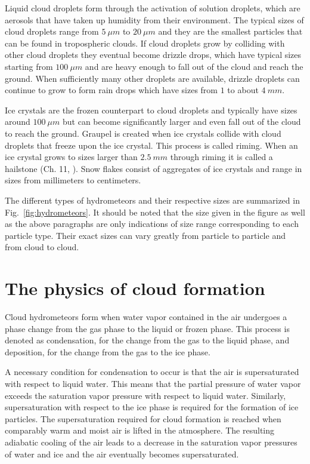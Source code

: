 Liquid cloud droplets form through the activation of  solution
droplets, which are aerosols that have taken up humidity from their environment.
The typical sizes of cloud droplets range from $5\ \unit{\mu m}$ to
$20\ \unit{\mu m}$ and they are the smallest particles that can be found in
tropospheric clouds. If cloud droplets grow by colliding with other cloud
droplets they eventual become drizzle drops, which have typical sizes
starting from $100\ \unit{\mu m}$ and are heavy enough to fall out of the cloud
and reach the ground. When sufficiently many other droplets are available,
drizzle droplets can continue to grow to form rain drops which have sizes from
$1$ to about $4\ \unit{mm}$.

Ice crystals are the frozen counterpart to cloud droplets and typically have
sizes around $100\ \unit{\mu m}$ but can become significantly larger and even
fall out of the cloud to reach the ground. Graupel is created when ice crystals
collide with cloud droplets that freeze upon the ice crystal. This process is
called riming. When an ice crystal grows to sizes larger than $2.5\ \unit{mm}$
through riming it is called a hailstone (Ch. 11, \textcite{lohmann16}). Snow flakes
consist of aggregates of ice crystals and range in sizes from millimeters to
centimeters.

The different types of hydrometeors and their respective sizes are summarized in
Fig.~\ref{fig:hydrometeors}. It should be noted that the size given in the
figure as well as the above paragraphs are only indications of size range
corresponding to each particle type. Their exact sizes can vary greatly from
particle to particle and from cloud to cloud.

\section{The physics of cloud formation}

Cloud hydrometeors form when water vapor contained in the air undergoes a phase
change from the gas phase to the liquid or frozen phase. This process is denoted
as condensation, for the change from the gas to the liquid phase, and
deposition, for the change from the gas to the ice phase.

A necessary condition for condensation to occur is that the air is
supersaturated with respect to liquid water. This means that the partial
pressure of water vapor exceeds the saturation vapor pressure with respect to
liquid water. Similarly, supersaturation with respect to the ice phase is
required for the formation of ice particles. The supersaturation required for
cloud formation  is reached when comparably warm and moist air is lifted
in the atmosphere. The resulting adiabatic cooling of the air leads to a
decrease in the saturation vapor pressures of water and ice and the air eventually
becomes supersaturated.

